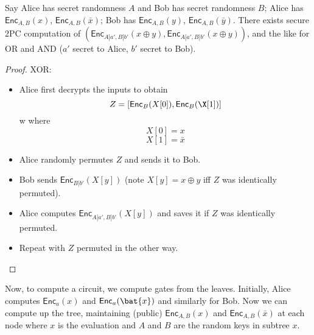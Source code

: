 \documentclass{scrartcl}
\begin{document}
\begin{sol}
\begin{enumerate}[A.]
        \begin{claim*}
            Say Alice has secret randomness $A$ and Bob has secret randomness $B$; Alice has $\textsf{Enc}_{A, B}(x)$, $\textsf{Enc}_{A, B}(\bar{x})$; Bob has $\textsf{Enc}_{A, B}(y)$, $\textsf{Enc}_{A, B}(\bar{y})$.
            There exists secure 2PC computation of $(\textsf{Enc}_{A|a', B|b'}(x\oplus y), \textsf{Enc}_{A|a', B|b'}(x\oplus y))$, and the like for OR and AND ($a'$ secret to Alice, $b'$ secret to Bob).
        \end{claim*}
        \begin{proof}
            XOR:
            \begin{itemize}
                \item Alice first decrypts the inputs to obtain
                \[Z = [\textsf{Enc}_B(X[0]), \textsf{Enc}_B(\X[1])]\]w
                where
                \[X[0] = x\]
                \[X[1] = \bar{x}\]
                \item Alice randomly permutes $Z$ and sends it to Bob.
                \item Bob sends $\textsf{Enc}_{B|b'}(X[y])$ (note $X[y] = x\oplus y$ iff $Z$ was identically permuted).
                \item Alice computes $\textsf{Enc}_{A|a', B|b'}(X[y])$ and saves it if $Z$ was identically permuted.
                \item Repeat with $Z$ permuted in the other way.
            \end{itemize}

        \end{proof}

        Now, to compute a circuit, we compute gates from the leaves. Initially, Alice computes $\textsf{Enc}_a(x)$ and $\textsf{Enc}_a(\bat{x})$ and similarly for Bob. Now we can compute up the tree, maintaining (public) $\textsf{Enc}_{A,B}(x)$ and $\textsf{Enc}_{A, B}(\bar{x})$ at each node where $x$ is the evaluation and $A$ and $B$ are the random keys in subtree $x$.
    \end{enumerate}
\end{sol}
\end{document}
